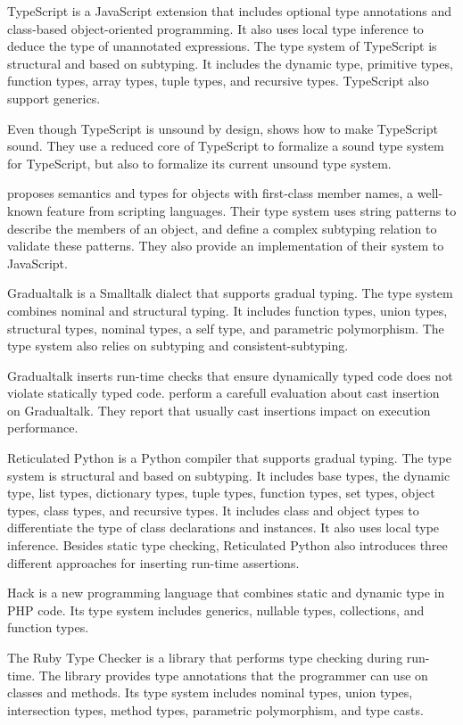 TypeScript \citep{typescript} is a JavaScript extension
that includes optional type annotations and class-based
object-oriented programming.
It also uses local type inference to deduce the type
of unannotated expressions.
The type system of TypeScript is structural and based
on subtyping.
It includes the dynamic type, primitive types, function
types, array types, tuple types, and recursive types.
TypeScript also support generics.

Even though TypeScript is unsound by design,
\citet{bierman2014typescript} shows how to make TypeScript sound.
They use a reduced core of TypeScript to formalize a
sound type system for TypeScript, but also to formalize
its current unsound type system.

\citet{politz2012semantics} proposes semantics and types for objects
with first-class member names, a well-known feature from scripting languages.
Their type system uses string patterns to describe the members of
an object, and define a complex subtyping relation to validate
these patterns.
They also provide an implementation of their system to JavaScript.

Gradualtalk \citep{allende2013gts} is a Smalltalk dialect that
supports gradual typing.
The type system combines nominal and structural typing.
It includes function types, union types, structural types,
nominal types, a self type, and parametric polymorphism.
The type system also relies on subtyping and consistent-subtyping.

Gradualtalk inserts run-time checks that ensure dynamically
typed code does not violate statically typed code.
\citet{allende2013cis} perform a carefull evaluation about
cast insertion on Gradualtalk.
They report that usually cast insertions impact on execution
performance.

Reticulated Python \citep{vitousek2014deg} is a Python compiler
that supports gradual typing.
The type system is structural and based on subtyping.
It includes base types, the dynamic type, list types,
dictionary types, tuple types, function types, set types,
object types, class types, and recursive types.
It includes class and object types to differentiate the
type of class declarations and instances.
It also uses local type inference.
Besides static type checking, Reticulated Python also introduces
three different approaches for inserting run-time assertions.

Hack \citep{hack} is a new programming language that combines
static and dynamic type in PHP code.
Its type system includes generics, nullable types, collections,
and function types.

The Ruby Type Checker \citep{ren2013rtc} is a library that
performs type checking during run-time.
The library provides type annotations that the programmer
can use on classes and methods.
Its type system includes nominal types, union types,
intersection types, method types, parametric polymorphism,
and type casts.

